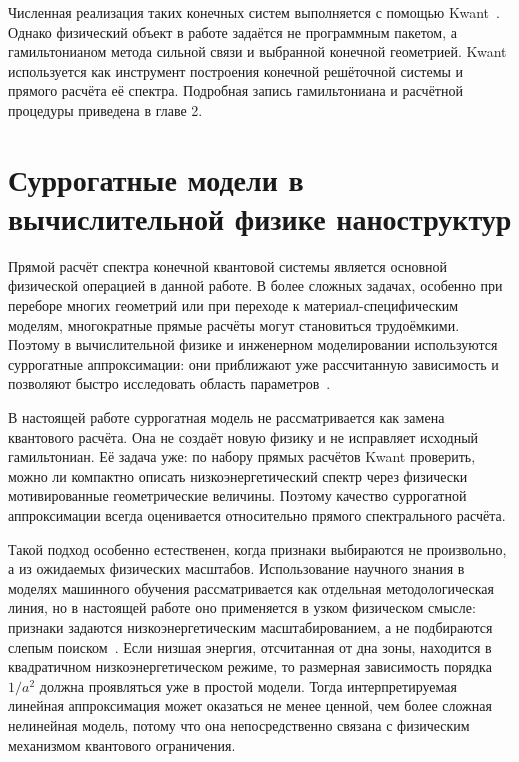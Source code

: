 Численная реализация таких конечных систем выполняется с помощью
Kwant~\cite{groth2014kwant}. Однако физический объект в работе задаётся не программным
пакетом, а гамильтонианом метода сильной связи и выбранной конечной геометрией. Kwant
используется как инструмент построения конечной решёточной системы и прямого расчёта её
спектра. Подробная запись гамильтониана и расчётной процедуры приведена в главе 2.

\section{Суррогатные модели в вычислительной физике наноструктур}

Прямой расчёт спектра конечной квантовой системы является основной физической операцией в
данной работе. В более сложных задачах, особенно при переборе многих геометрий или при
переходе к материал-специфическим моделям, многократные прямые расчёты могут становиться
трудоёмкими. Поэтому в вычислительной физике и инженерном моделировании используются
суррогатные аппроксимации: они приближают уже рассчитанную зависимость и позволяют быстро
исследовать область параметров~\cite{queipo2005surrogate,forrester2008surrogate,hou2024sur
rogateprotocol}.

В настоящей работе суррогатная модель не рассматривается как замена квантового расчёта.
Она не создаёт новую физику и не исправляет исходный гамильтониан. Её задача уже: по
набору прямых расчётов Kwant проверить, можно ли компактно описать низкоэнергетический
спектр через физически мотивированные геометрические величины. Поэтому качество
суррогатной аппроксимации всегда оценивается относительно прямого спектрального расчёта.

Такой подход особенно естественен, когда признаки выбираются не произвольно, а из
ожидаемых физических масштабов. Использование научного знания в моделях машинного обучения
рассматривается как отдельная методологическая линия, но в настоящей работе оно
применяется в узком физическом смысле: признаки задаются низкоэнергетическим
масштабированием, а не подбираются слепым поиском~\cite{willard2022piml}. Если низшая
энергия, отсчитанная от дна зоны, находится в квадратичном низкоэнергетическом режиме, то
размерная зависимость порядка $1/a^2$ должна проявляться уже в простой модели. Тогда
интерпретируемая линейная аппроксимация может оказаться не менее ценной, чем более сложная
нелинейная модель, потому что она непосредственно связана с физическим механизмом
квантового ограничения.

